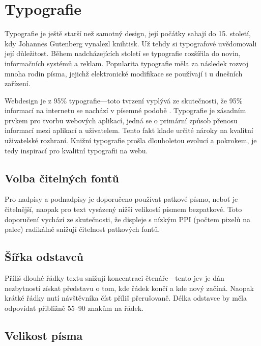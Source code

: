 \section{Typografie}
\label{sec:typografie}

\begin{quote}
     \cite{svalbach}
\end{quote}

\noindent
Typografie je ještě starší než samotný design, její počátky sahají do 15. století, kdy Johannes Gutenberg vynalezl knihtisk. Už tehdy si typografové uvědomovali její důležitost. Během nadcházejících století se typografie rozšířila do novin, informačních systémů a reklam. Popularita typografie měla za následek rozvoj mnoha rodin písma, jejichž elektronické modifikace se používají i u dnešních zařízení.

Webdesign je z 95\% typografie---toto tvrzení vyplývá ze skutečnosti, že 95\% informací na internetu se nachází v písemné podobě \cite{typography}. Typografie je zásadním prvkem pro tvorbu webových aplikací, jedná se o primární způsob přenosu informací mezi aplikací a uživatelem. Tento fakt klade určité nároky na kvalitní uživatelské rozhraní. Knižní typografie prošla dlouholetou evolucí a pokrokem, je tedy inspirací pro kvalitní typografii na webu.

\subsection{Volba čitelných fontů}

Pro nadpisy a podnadpisy je doporučeno používat patkové písmo, neboť je čitelnější, naopak pro text vysázený nižší velikostí písmem bezpatkové. Toto doporučení vychází ze skutečnosti, že displeje s nízkým PPI (počtem pixelů na palec) radikálně snižují čitelnost patkových fontů.

\subsection{Šířka odstavců}

Příliš dlouhé řádky textu snižují koncentraci čtenáře---tento jev je dán nezbytností získat představu o tom, kde řádek končí a kde nový začíná. Naopak krátké řádky nutí návštěvníka číst příliš přerušovaně. Délka odstavce by měla odpovídat přibližně 55--90 znakům na řádek.

\subsection{Velikost písma}

